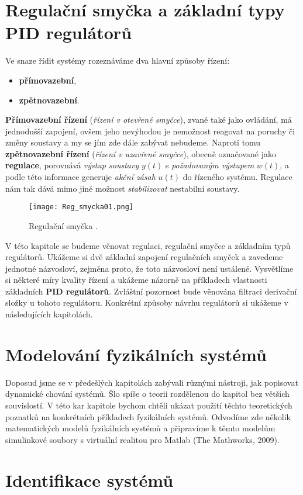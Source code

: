   \section{Regulační smyčka a základní typy PID regulátorů}\label{TKY:sec001}
    Ve snaze řídit systémy rozeznáváme dva hlavní způsoby řízení:
      \begin{itemize}
        \item \textbf{přímovazební},
        \item \textbf{zpětnovazební}.
      \end{itemize}
    \textbf{Přímovazební řízení} (\emph{řízení v otevřené smyčce}), zvané také jako ovládání, má 
    jednodušší zapojení, ovšem jeho nevýhodou je nemožnost reagovat na poruchy či změny soustavy a 
    my se jím zde dále zabývat nebudeme. Naproti tomu \textbf{zpětnovazební řízení} (\emph{řízení v 
    uzavřené smyčce}), obecně označované jako \textbf{regulace}, porovnává \emph{výstup soustavy} 
    \(y(t)\) s \emph{požadovaným výstupem} \(w(t)\), a podle této informace generuje \emph{akční 
    zásah} \(u(t)\) do řízeného systému. Regulace nám tak dává mimo jiné možnost 
    \emph{stabilizovat} nestabilní soustavy.

    \begin{figure}[ht!] %
      \centering
      \texttt{[image: Reg\_smycka01.png]}
      \caption{Regulační smyčka \cite[s.~215]{Roubal2011}.}
      \label{tky:fig_feedback003}
    \end{figure}
    V této kapitole se budeme věnovat regulaci, regulační smyčce a základním typů regulátorů. 
    Ukážeme si dvě základní zapojení regulačních smyček a zavedeme jednotné názvosloví, zejména 
    proto, že toto názvosloví není ustálené. Vysvětlíme si některé míry kvality řízení a ukážeme 
    názorně na příkladech vlastnosti základních \textbf{PID regulátorů}. Zvláštní pozornost bude 
    věnována filtraci derivační složky u tohoto regulátoru. Konkrétní způsoby návrhu regulátorů si 
    ukážeme v následujících kapitolách.
    
  
  \section{Modelování fyzikálních systémů}\label{TKY:sec002}
    Doposud jsme se v předešlých kapitolách zabývali různými nástroji, jak popisovat dynamické 
    chování systémů. Šlo spíše o teorii rozdělenou do kapitol bez větších souvislostí. V této kar 
    kapitole bychom chtěli ukázat použití těchto teoretických poznatků na konkrétních příkladech 
    fyzikálních systémů. Odvodíme zde několik matematických modelů fyzikálních systémů a připravíme 
    k těmto modelům simulinkové soubory s virtuální realitou pro Matlab (The Mathworks, 2009).
    
  \section{Identifikace systémů}\label{TKY:sec003}

\printbibliography[title={Seznam literatury}, heading=subbibliography]
